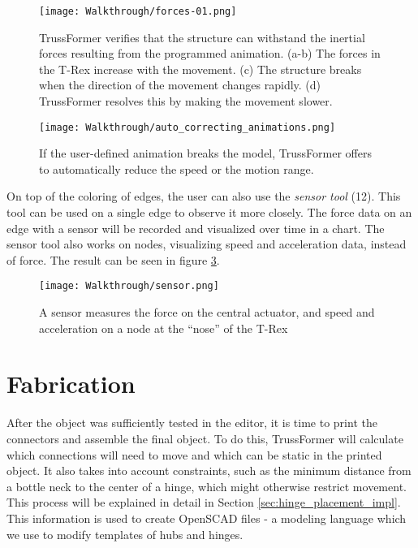 \begin{figure}[h!]
    \texttt{[image: Walkthrough/forces-01.png]}
    \centering
    \caption{TrussFormer verifies that the structure can withstand the inertial forces resulting from the programmed animation. (a-b) The forces in the T-Rex increase with the movement. (c) The structure breaks when the direction of the movement changes rapidly. (d) TrussFormer resolves this by making the movement slower.}
    \label{fig:fix_breaking}
\end{figure}
\begin{figure}[h!]
    \texttt{[image: Walkthrough/auto\_correcting\_animations.png]}
    \centering
    \caption{If the user-defined animation breaks the model, TrussFormer offers to automatically reduce the speed or the motion range.}
    \label{fig:correcting_animation}
\end{figure}

On top of the coloring of edges, the user can also use the \textit{sensor tool} (12). This tool can be used on a single edge to observe it more closely. The force data on an edge with a sensor will be recorded and visualized over time in a chart. The sensor tool also works on nodes, visualizing speed and acceleration data, instead of force. The result can be seen in figure \ref{fig:sensor}.\\
\begin{figure}[h!]
    \texttt{[image: Walkthrough/sensor.png]}
    \centering
    \caption{A sensor measures the force on the central actuator, and speed and acceleration on a node at the ``nose'' of the T-Rex}
    \label{fig:sensor}
\end{figure}

\section{Fabrication}
After the object was sufficiently tested in the editor, it is time to print the connectors and assemble the final object. To do this, TrussFormer will calculate which connections will need to move and which can be static in the printed object. It also takes into account constraints, such as the minimum distance from a bottle neck to the center of a hinge, which might otherwise restrict movement. This process will be explained in detail in Section \ref{sec:hinge_placement_impl}. This information is used to create OpenSCAD files - a modeling language which we use to modify templates of hubs and hinges.

